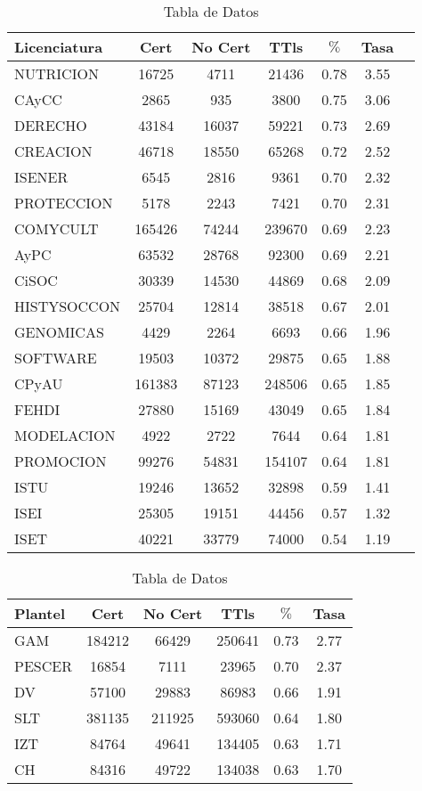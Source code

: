 \documentclass[12pt]{article}
\begin{document}
\begin{table}
\centering
\begin{tabular}{|l|c|c|c|c|c|c|}
\hline
Licenciatura & Cert & No Cert & TTls & $\%$ & Tasa \\
\hline\hline
NUTRICION & 16725 & 4711 & 21436 & 0.78 & 3.55 \\
CAyCC & 2865 & 935 & 3800 & 0.75 & 3.06 \\\hline\hline
DERECHO & 43184 & 16037 & 59221 & 0.73 & 2.69 \\
CREACION & 46718 & 18550 & 65268 & 0.72 & 2.52 \\\hline\hline
ISENER & 6545 & 2816 & 9361 & 0.70 & 2.32 \\
PROTECCION & 5178 & 2243 & 7421 & 0.70 & 2.31 \\
COMYCULT & 165426 & 74244 & 239670 & 0.69 & 2.23 \\
AyPC & 63532 & 28768 & 92300 & 0.69 & 2.21 \\
CiSOC & 30339 & 14530 & 44869 & 0.68 & 2.09 \\
HISTYSOCCON & 25704 & 12814 & 38518 & 0.67 & 2.01 \\\hline\hline
GENOMICAS & 4429 & 2264 & 6693 & 0.66 & 1.96 \\
SOFTWARE & 19503 & 10372 & 29875 & 0.65 & 1.88 \\
CPyAU & 161383 & 87123 & 248506 & 0.65 & 1.85 \\
FEHDI & 27880 & 15169 & 43049 & 0.65 & 1.84 \\
MODELACION & 4922 & 2722 & 7644 & 0.64 & 1.81 \\
PROMOCION & 99276 & 54831 & 154107 & 0.64 & 1.81 \\\hline\hline
ISTU & 19246 & 13652 & 32898 & 0.59 & 1.41 \\
ISEI & 25305 & 19151 & 44456 & 0.57 & 1.32 \\
ISET & 40221 & 33779 & 74000 & 0.54 & 1.19 \\
\hline\hline
\end{tabular}
\caption{Tabla de Datos}
\label{tab:datos}
\end{table}


\begin{table}
\centering
\begin{tabular}{|l|c|c|c|c|c|}
\hline
Plantel & Cert & No Cert & TTls & $\%$ & Tasa\\
\hline\hline
GAM & 184212 & 66429 & 250641 & 0.73 & 2.77 \\
PESCER & 16854 & 7111 & 23965 & 0.70 & 2.37 \\\hline\hline
DV & 57100 & 29883 & 86983 & 0.66 & 1.91 \\
SLT & 381135 & 211925 & 593060 & 0.64 & 1.80 \\
IZT & 84764 & 49641 & 134405 & 0.63 & 1.71 \\
CH & 84316 & 49722 & 134038 & 0.63 & 1.70 \\\hline\hline
\end{tabular}
\caption{Tabla de Datos}
\label{tab:datos2}
\end{table}
\end{document}
